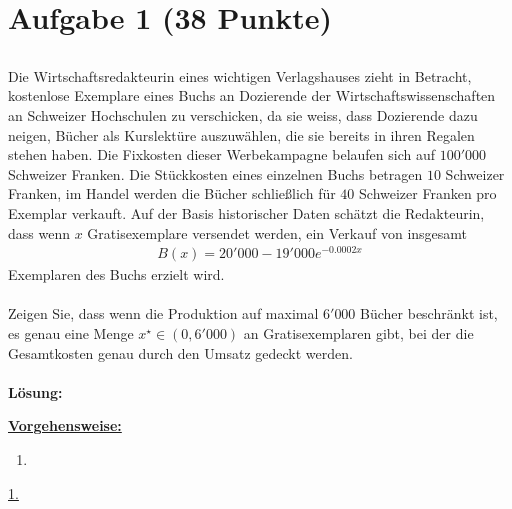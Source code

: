 \vspace{1cm}
\renewcommand{\labelenumi}{\theenumi.}
\section*{Aufgabe 1 (38 Punkte)}
\vspace{0.4cm}
\subsection*{} 
Die Wirtschaftsredakteurin eines wichtigen Verlagshauses zieht in Betracht,
kostenlose Exemplare eines Buchs an Dozierende der Wirtschaftswissenschaften an Schweizer Hochschulen zu verschicken, da sie weiss, dass Dozierende dazu neigen, Bücher als Kurslektüre auszuwählen, die sie bereits in ihren Regalen stehen haben. Die Fixkosten dieser Werbekampagne belaufen sich auf $100'000$ Schweizer Franken.
Die Stückkosten eines einzelnen Buchs betragen $10$ Schweizer Franken, im Handel werden die Bücher schließlich für $40$ Schweizer Franken pro Exemplar verkauft.
Auf der Basis historischer Daten schätzt die Redakteurin, dass wenn $x$ Gratisexemplare versendet werden, ein Verkauf von insgesamt
\begin{align*}
	B(x) = 20'000 - 19'000 e^{-0.0002 x }
\end{align*}
Exemplaren des Buchs erzielt wird. \\
\\
Zeigen Sie, dass wenn die Produktion auf maximal $6'000$ Bücher beschränkt ist, es genau eine Menge $ x^\star \in (0, 6'000)$ an Gratisexemplaren gibt, bei der die Gesamtkosten genau durch den Umsatz gedeckt werden.
\
\\ \\
\textbf{Lösung:}
\begin{mdframed}
\underline{\textbf{Vorgehensweise:}}
\renewcommand{\labelenumi}{\theenumi.}
\begin{enumerate}
\item 

\end{enumerate}
\end{mdframed}
\underline{1. }\\

